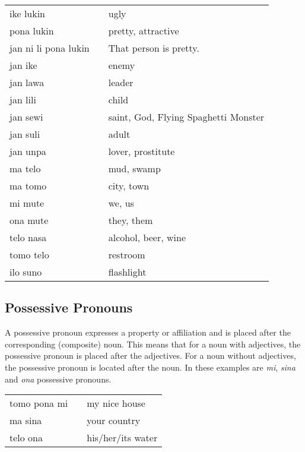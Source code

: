 \begin{supertabular}{p{5,5cm}|ll}
ike lukin && ugly  \\
pona lukin && pretty, attractive \\
jan ni li pona lukin && That person is pretty. \\
jan ike && enemy \\
jan lawa && leader \\
jan lili && child \\
jan sewi && saint, God, Flying Spaghetti Monster \\
jan suli && adult \\
jan unpa && lover, prostitute \\
ma telo && mud, swamp \\
ma tomo && city, town \\
mi mute && we, us \\
ona mute && they, them \\
telo nasa && alcohol, beer, wine \\
tomo telo && restroom \\
ilo suno && flashlight \\ 
\end{supertabular} 
 
\subsection*{Possessive Pronouns}

A possessive pronoun expresses a property or affiliation and is placed after the corresponding (composite) noun. 
This means that for a noun with adjectives, the possessive pronoun is placed after the adjectives. 
For a noun without adjectives, the possessive pronoun is located after the noun.
In these examples are \textit{mi}, \textit{sina} and \textit{ona} possessive pronouns. 

\begin{supertabular}{p{5,5cm}|ll}
tomo pona mi && my nice house \\
ma sina && your country \\
telo ona && his/her/its water \\
\end{supertabular} 

